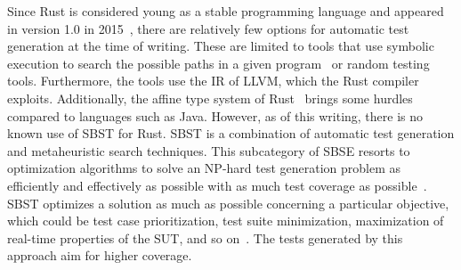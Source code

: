 \documentclass{article}
\begin{document}

Since Rust is considered young as a stable programming language and appeared in version 1.0 in 2015~\cite{Rust10}, there are relatively few options for automatic test generation at the time of writing. These are limited to tools that use symbolic execution to search the possible paths in a given program~\cite{cadar2008klee} or random testing tools. Furthermore, the tools use the \ac{IR} of LLVM, which the Rust compiler exploits. Additionally, the affine type system of Rust~\cite{Anderson2016} brings some hurdles compared to languages such as Java. However, as of this writing, there is no known use of \ac{SBST} for Rust. \ac{SBST} is a combination of automatic test generation and metaheuristic search techniques. This subcategory of SBSE resorts to optimization algorithms to solve an NP-hard test generation problem as efficiently and effectively as possible with as much test coverage as possible~\cite{Khari2019}. \ac{SBST} optimizes a solution as much as possible concerning a particular objective, which could be test case prioritization, test suite minimization, maximization of real-time properties of the SUT, and so on~\cite{Khari2019}. The tests generated by this approach aim for higher coverage. 
\end{document}
